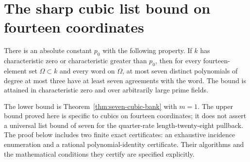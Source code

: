 \section{The sharp cubic list bound on fourteen coordinates}
\label{app:global-seven-cubics}

\begin{theorem}\label{thm:global-seven-cubics}
There is an absolute constant $p_0$ with the following property.  If $k$
has characteristic zero or characteristic greater than $p_0$, then for
every fourteen-element set $\Omega\subset k$ and every word on $\Omega$,
at most seven distinct polynomials of degree at most three have at least
seven agreements with the word.  The bound is attained in characteristic
zero and over arbitrarily large prime fields.
\end{theorem}

The lower bound is Theorem~\ref{thm:seven-cubic-bank} with $m=1$.
The upper bound proved here is specific to cubics on fourteen coordinates;
it does not assert a universal list bound of seven for the quarter-rate
length-twenty-eight pullback.  The proof below includes two finite exact
certificates: an exhaustive incidence enumeration and a rational
polynomial-identity certificate.  Their algorithms and the mathematical
conditions they certify are specified explicitly.

